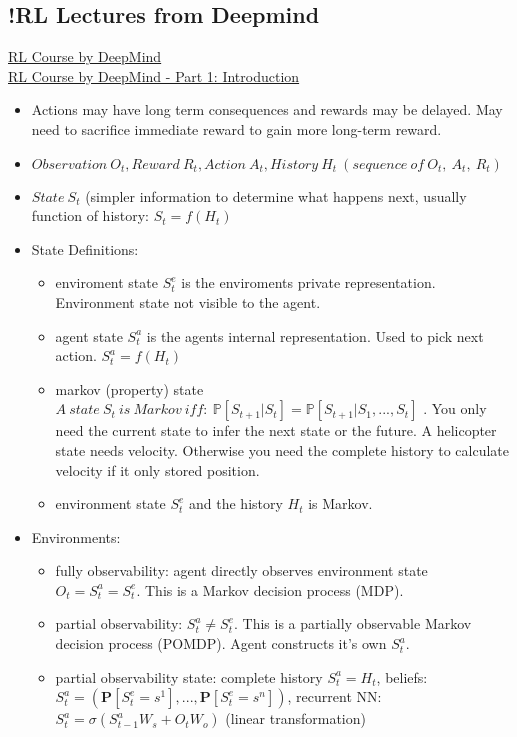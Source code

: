 \subsection{!RL Lectures from Deepmind}
\href{https://www.davidsilver.uk/teaching/}{RL Course by DeepMind}
\\
\href{https://www.youtube.com/watch?v=2pWv7GOvuf0&list=PLqYmG7hTraZDM-OYHWgPebj2MfCFzFObQ}{RL Course by DeepMind - Part 1: Introduction}
\begin{itemize}[noitemsep,nolistsep]
	\item Actions may have long term consequences and rewards may be delayed. May need to sacrifice immediate reward to gain more long-term reward.
	\item $Observation\ O_t, Reward\ R_t, Action\ A_t, History\ H_t\ (sequence\ of\ O_t,\ A_t,\ R_t)$
	\item $State\ S_t$ (simpler information to determine what happens next, usually function of history: $S_t = f(H_t)$
	\item State Definitions:
	\begin{itemize}[noitemsep,nolistsep]
		\item enviroment state $S_t^e$ is the enviroments private representation. Environment state not visible to the agent.
		\item agent state $S_t^a$ is the agents internal representation. Used to pick next action. $S_t^a = f(H_t)$
		\item markov (property) state $A\ state\ S_t\ is\ Markov\ iff:\ \mathbb{P}[S_{t+1} | S_t] = \mathbb{P}[S_{t+1}|S_1,...,S_t]$ . You only need the current state to infer the next state or the future. A helicopter state needs velocity. Otherwise you need the complete history to calculate velocity if it only stored position.
		\item environment state $S_t^e$ and the history $H_t$ is Markov.
	\end{itemize} 
	\item Environments:
	\begin{itemize}[noitemsep,nolistsep]
		\item fully observability: agent directly observes environment state $O_t = S_t^a = S_t^e$. This is a Markov decision process (MDP).
		\item partial observability: $S_t^a \neq S_t^e$. This is a partially observable Markov decision process (POMDP). Agent constructs it's own $S_t^a$.
		\item partial observability state: complete history $S_t^a = H_t$, beliefs: $S_t^a = (\mathbf{P}[S_t^e = s^1],...,\mathbf{P}[S_t^e = s^n])$, recurrent NN: $S_t^a = \sigma(S_{t-1}^a W_s + O_t W_o)$ (linear transformation)

\end{itemize}
\end{itemize}
